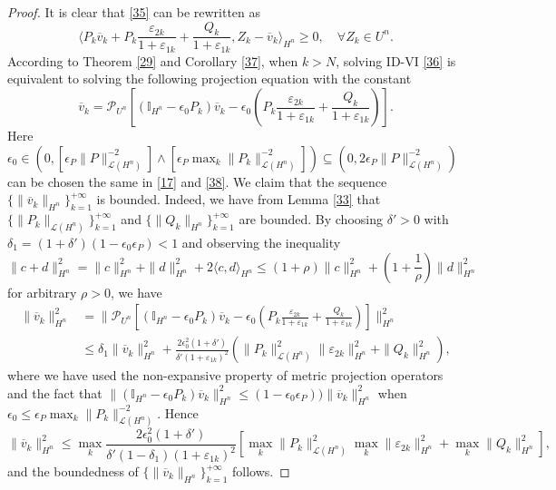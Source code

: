 \documentclass[10pt]{article}
\begin{document}
\begin{proof}
It is clear that \eqref{35} can be rewritten as
\begin{equation}\label{36}
\langle P_k\overline{v}_k+P_k\frac{\varepsilon_{2k}}{1+\varepsilon_{1k}}+\frac{Q_k}{1+\varepsilon_{1k}},Z_k-\overline{v}_k\rangle_{H^n}\geq 0,\quad \forall Z_k\in U^n.
\end{equation}
According to Theorem \ref{29} and Corollary \ref{37}, when $k>N$,  solving ID-VI \eqref{36} is equivalent to solving the following projection equation with the constant 
\begin{equation}\label{38}
\overline{v}_k=\mathcal{P}_{U^n}[(\mathbb{I}_{H^n}-\epsilon_0P_k)\overline{v}_k-\epsilon_0(P_k\frac{\varepsilon_{2k}}{1+\varepsilon_{1k}}+\frac{Q_k}{1+\varepsilon_{1k}})].
\end{equation}
Here  $\epsilon_0\in(0,[\epsilon_P\|P\|_{\mathcal{L}(H^n)}^{-2}]\wedge [\epsilon_P\max_{k}\|P_k\|_{\mathcal{L}(H^n)}^{-2}])\subseteq(0,2\epsilon_P\|P\|_{\mathcal{L}(H^n)}^{-2})$ can be chosen the same in \eqref{17} and \eqref{38}. We claim that the sequence $\{\|\overline{v}_k\|_{H^n}\}_{k=1}^{+\infty}$ is bounded. Indeed, we have from Lemma \ref{33} that
$\{\|P_k\|_{\mathcal{L}(H^n)}\}_{k=1}^{+\infty}$ and $\{\|Q_k\|_{H^n}\}_{k=1}^{+\infty}$ are bounded. By choosing $\delta'>0$ with $\delta_1=(1+\delta')(1-\epsilon_0\epsilon_P)<1$ and observing the inequality 
\begin{equation}\label{41}
\|c+d\|_{H^n}^2=\|c\|_{H^n}^2+\|d\|_{H^n}^2+2\langle c,d\rangle_{H^n}\leq(1+\rho)\|c\|_{H^n}^2+(1+\frac{1}{\rho})\|d\|_{H^n}^2
\end{equation}
for arbitrary $\rho>0$, we have
\begin{align*}
\|\overline{v}_k\|_{H^n}^2&=\|\mathcal{P}_{U^n}[(\mathbb{I}_{H^n}-\epsilon_0P_k)\overline{v}_k-\epsilon_0(P_k\frac{\varepsilon_{2k}}{1+\varepsilon_{1k}}+\frac{Q_k}{1+\varepsilon_{1k}})]\|_{H^n}^2\\
&\le \delta_1\|\overline{v}_k\|_{H^n}^2+\frac{2\epsilon_0^2(1+\delta')}{\delta'(1+\varepsilon_{1k})^2}(\|P_k\|_{\mathcal{L}(H^n)}^2
\|\varepsilon_{2k}\|_{H^n}^2+\|Q_k\|_{H^n}^2),
\end{align*}
where we have used the non-expansive property of metric projection operators and the fact that
$
\|(\mathbb{I}_{H^n}-\epsilon_0P_k)\overline{v}_k\|_{H^n}^2
\leq (1-\epsilon_0\epsilon_P))\|\overline{v}_k\|_{H^n}^2$ when $\epsilon_0\leq \epsilon_P\max_{k}\|P_k\|_{\mathcal{L}(H^n)}^{-2}$.
Hence
$$
\|\overline{v}_k\|_{H^n}^2\leq \max_{k}\frac{2\epsilon_0^2(1+\delta')}{\delta'(1-\delta_1)(1+\varepsilon_{1k})^2}[\max_{k}\|P_k\|_{\mathcal{L}(H^n)}^2\max_{k}\|\varepsilon_{2k}\|_{H^n}^2+\max_{k}\|Q_k\|_{H^n}^2],
$$
and the boundedness of $\{\|\overline{v}_k\|_{H^n}\}_{k=1}^{+\infty}$ follows.


\end{proof}
\end{document}
